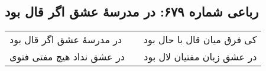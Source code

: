 \begin{center}
\section*{رباعی شماره ۶۷۹: در مدرسهٔ عشق اگر قال بود}
\label{sec:0679}
\begin{longtable}{l p{0.5cm} r}
در مدرسهٔ عشق اگر قال بود
&&
کی فرق میان قال با حال بود
\\
در عشق نداد هیچ مفتی فتوی
&&
در عشق زبان مفتیان لال بود
\\
\end{longtable}
\end{center}
